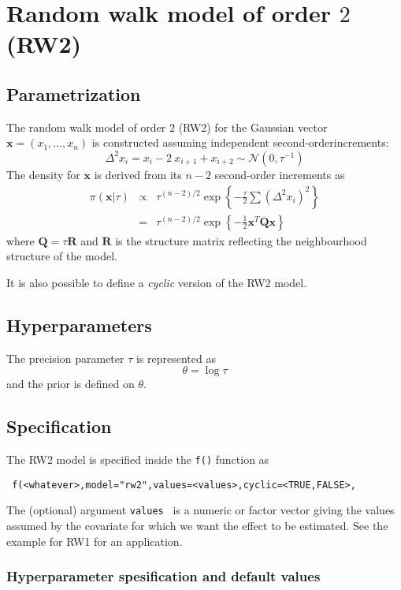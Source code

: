\documentclass[a4paper,11pt]{article}
\begin{document}
\section*{Random walk model of order $2$ (RW2)}

\subsection*{Parametrization}
The random walk model of order $2$ (RW2) for the Gaussian vector
$\mathbf{x}=(x_1,\dots,x_n)$ is constructed assuming independent
second-orderincrements:
\[
\Delta^2 x_i = x_i-2\ x_{i+1}+x_{i+2}\sim\mathcal{N}(0,\tau^{-1})
\]
The density for $\mathbf{x}$ is derived from its $n-2$ second-order
increments as
\begin{eqnarray}
    \pi(\mathbf{x}|\tau) &\propto& \tau^{(n-2)/2} \exp\left\{-\frac{\tau}{2} \sum (\Delta^2 x_i)^2\right\}\\
    & = &\tau^{(n-2)/2}\exp\left\{-\frac{1}{2}\mathbf{x}^T\mathbf{Q}\mathbf{x} \right\}
\end{eqnarray}
where $\mathbf{Q}=\tau\mathbf{R}$ and $\mathbf{R}$ is the structure
matrix reflecting the neighbourhood structure of the model.

It is also possible to define a {\it cyclic} version of the RW2 model.

\subsection*{Hyperparameters}

The precision parameter $\tau$ is represented as
\begin{displaymath}
    \theta =\log \tau
\end{displaymath}
and the prior is defined on $\theta$.

\subsection*{Specification}

The RW2 model is specified inside the {\tt f()} function as
\begin{verbatim}
 f(<whatever>,model="rw2",values=<values>,cyclic=<TRUE,FALSE>,
\end{verbatim}
The (optional) argument {\tt values } is a numeric or factor vector
giving the values assumed by the covariate for which we want the
effect to be estimated. See the example for RW1 for an application.

\subsubsection*{Hyperparameter spesification and default values}

\end{document}
